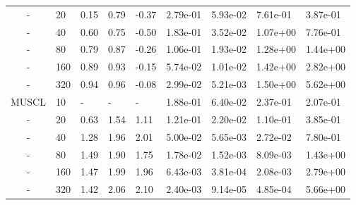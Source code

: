 \begin{table}[p]
{\begin{tabular}{cllllllll}
         - &  20 & 0.15 & 0.79 & -0.37& 2.79e-01 & 5.93e-02 & 7.61e-01 & 3.87e-01 \\ 
         - &  40 & 0.60 & 0.75 & -0.50& 1.83e-01 & 3.52e-02 & 1.07e+00 & 7.76e-01 \\ 
         - &  80 & 0.79 & 0.87 & -0.26& 1.06e-01 & 1.93e-02 & 1.28e+00 & 1.44e+00 \\ 
         - & 160 & 0.89 & 0.93 & -0.15& 5.74e-02 & 1.01e-02 & 1.42e+00 & 2.82e+00 \\ 
         - & 320 & 0.94 & 0.96 & -0.08& 2.99e-02 & 5.21e-03 & 1.50e+00 & 5.62e+00 \\ 
   \hline
          MUSCL &  10 & - & - & - & 1.88e-01 & 6.40e-02 & 2.37e-01 & 2.07e-01 \\ 
          - &  20 & 0.63 & 1.54 & 1.11 & 1.21e-01 & 2.20e-02 & 1.10e-01 & 3.85e-01 \\ 
          - &  40 & 1.28 & 1.96 & 2.01 & 5.00e-02 & 5.65e-03 & 2.72e-02 & 7.80e-01 \\ 
          - &  80 & 1.49 & 1.90 & 1.75 & 1.78e-02 & 1.52e-03 & 8.09e-03 & 1.43e+00 \\ 
          - & 160 & 1.47 & 1.99 & 1.96 & 6.43e-03 & 3.81e-04 & 2.08e-03 & 2.79e+00 \\ 
          - & 320 & 1.42 & 2.06 & 2.10 & 2.40e-03 & 9.14e-05 & 4.85e-04 & 5.66e+00 \\ 
   \hline
   \end{tabular}
   }
\end{table}

\clearpage

